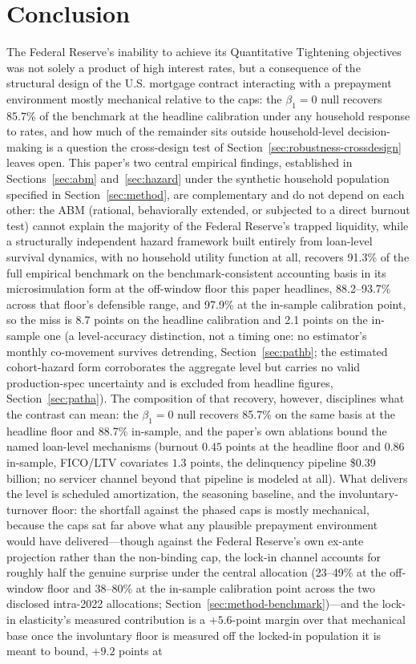 \documentclass[12pt]{article}
\begin{document}
\section{Conclusion}\label{sec:conclusion}

The Federal Reserve's inability to achieve its Quantitative Tightening objectives was not solely a product of high interest rates, but a consequence of the structural design of the U.S. mortgage contract interacting with a prepayment environment mostly mechanical relative to the caps: the $\beta_1 = 0$ null recovers 85.7\% of the benchmark at the headline calibration under any household response to rates, and how much of the remainder sits outside household-level decision-making is a question the cross-design test of Section~\ref{sec:robustness-crossdesign} leaves open. This paper's two central empirical findings, established in Sections~\ref{sec:abm} and~\ref{sec:hazard} under the synthetic household population specified in Section~\ref{sec:method}, are complementary and do not depend on each other: the ABM (rational, behaviorally extended, or subjected to a direct burnout test) cannot explain the majority of the Federal Reserve's trapped liquidity, while a structurally independent hazard framework built entirely from loan-level survival dynamics, with no household utility function at all, recovers 91.3\% of the full empirical benchmark on the benchmark-consistent accounting basis in its microsimulation form at the off-window floor this paper headlines, 88.2--93.7\% across that floor's defensible range, and 97.9\% at the in-sample calibration point, so the miss is 8.7 points on the headline calibration and 2.1 points on the in-sample one (a level-accuracy distinction, not a timing one: no estimator's monthly co-movement survives detrending, Section~\ref{sec:pathb}; the estimated cohort-hazard form corroborates the aggregate level but carries no valid production-spec uncertainty and is excluded from headline figures, Section~\ref{sec:patha}). The composition of that recovery, however, disciplines what the contrast can mean: the $\beta_1 = 0$ null recovers 85.7\% on the same basis at the headline floor and 88.7\% in-sample, and the paper's own ablations bound the named loan-level mechanisms (burnout $0.45$ points at the headline floor and $0.86$ in-sample, FICO/LTV covariates $1.3$ points, the delinquency pipeline \$0.39 billion; no servicer channel beyond that pipeline is modeled at all). What delivers the level is scheduled amortization, the seasoning baseline, and the involuntary-turnover floor: the shortfall against the phased caps is mostly mechanical, because the caps sat far above what any plausible prepayment environment would have delivered---though against the Federal Reserve's own ex-ante projection rather than the non-binding cap, the lock-in channel accounts for roughly half the genuine surprise under the central allocation (23--49\% at the off-window floor and 38--80\% at the in-sample calibration point across the two disclosed intra-2022 allocations; Section~\ref{sec:method-benchmark})---and the lock-in elasticity's measured contribution is a $+5.6$-point margin over that mechanical base once the involuntary floor is measured off the locked-in population it is meant to bound, $+9.2$ points at 
\end{document}
